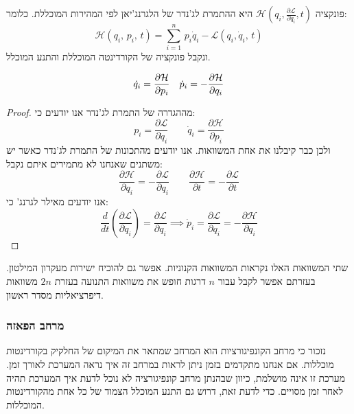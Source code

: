\documentclass{tstextbook}
\begin{document}
\begin{definition}[המילטוניאן]
פונקציה \(\mathcal{\mathcal{H}}\left( q_{i},\frac{\partial \mathcal{\mathcal{L}} } {\partial \dot{q}_{i}},t \right)\) היא ההתמרת לג'נדר של הלגרנג'יאן לפי המהירות המוכללת. כלומר:
$$\mathcal{\mathcal{H}}(q_{i},\,p_{i},\,t)=\sum_{i=1}^{n}\,p_{i}{\dot{q}}_{i}-\mathcal{L}(q_{i},{\dot{q}}_{i},\,t)$$
ונקבל פונקציה של הקורדינטה המוכללת והתנע המוכלל.

\end{definition}
\begin{theorem}
$$\begin{array}{c c}{{\dot{q}_{i}=\displaystyle\frac{\partial \mathcal{\mathcal{H}}}{\partial p_{i}}}}& {{\dot{p}_{i}=-\displaystyle\frac{\partial \mathcal{\mathcal{H}}}{\partial q_{i}}}}\end{array}$$

\end{theorem}
\begin{proof}
מההגדרה של התמרת לג'נדר אנו יודעים כי:
$$p_{i}=\frac{\partial \mathcal{L}}{\partial\dot{q}_{i}}\quad\quad\dot{q}_{i}=\frac{\partial \mathcal{\mathcal{H}}}{\partial p_{i}}$$
ולכן כבר קיבלנו את אחת המשוואות. אנו יודעים מהתכונות של התמרת לג'נדר כאשר יש משתנים שאנחנו לא מתמירים איתם נקבל:
$${\frac{\partial \mathcal{\mathcal{H}}}{\partial q_{i}}}=-{\frac{\partial \mathcal{L}}{\partial q_{i}}}\quad\quad{\frac{\partial \mathcal{\mathcal{H}}}{\partial t}}=-{\frac{\partial \mathcal{L}}{\partial t}}$$
אנו יודעים מאילר לגרנג' כי:
$$\frac{d}{d t}\left(\frac{\partial \mathcal{L}}{\partial\dot{q}_{i}}\right)=\frac{\partial \mathcal{L}}{\partial q_{i}}\implies \dot{p}_{i}=\frac{\partial \mathcal{L}}{\partial q_{i}}=-\frac{\partial \mathcal{\mathcal{H}}}{\partial q_{i}}$$

\end{proof}
שתי המשוואות האלו נקראות המשוואות הקנוניות. אפשר גם להוכיח ישירות מעקרון המילטון. בעזרתם אפשר לקבל עבור \(n\) דרגות חופש את משוואות התנועה בעזרת \(2n\) משוואות דיפרציאליות מסדר ראשון. 

\subsubsection{מרחב הפאזה}

נזכור כי מרחב הקונפיגורציות הוא המרחב שמתאר את המיקום של החלקיק בקורדינטות מוכללות. אם אנחנו מתקדמים בזמן ניתן לראות במרחב זה איך נראה המערכת לאורך זמן. מערכת זו אינה מושלמת, כיוון שבהנתן מרחב קונפיגורציה לא נוכל לדעת איך המערכת תהיה לאחר זמן מסויים. כדי לדעת זאת, דרוש גם התנע המוכלל הצמוד של כל אחת מהקורדינטות המוכללות.
\end{document}
